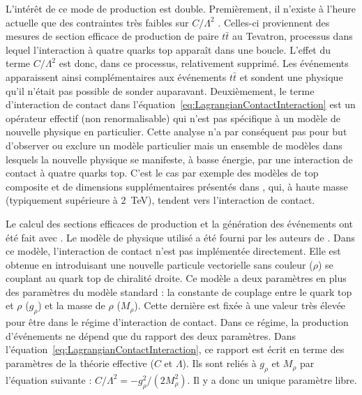 L'int\'er\^et de ce mode de production est double. 
Premi\`erement, il n'existe \`a l'heure actuelle que des contraintes tr\`es faibles sur $C/\Lambda^2$ \cite{1126-6708-2009-05-022}. 
Celles-ci proviennent des mesures de section efficace de production de paire $t\bar{t}$ au Tevatron, processus dans lequel l'interaction \`a quatre quarks top appara\^it dans une boucle. L'effet du terme $C/\Lambda^2$ est donc, dans ce processus, relativement supprim\'e. Les \'ev\'enements \fourtop{} apparaissent ainsi compl\'ementaires aux \'ev\'enements $t\bar{t}$ et sondent une physique qu'il n'\'etait pas possible de sonder auparavant. Deuxi\`emement, le terme d'interaction de contact dans l'\'equation~\ref{eq:LagrangianContactInteraction} est un op\'erateur effectif (non renormalisable) qui n'est pas sp\'ecifique \`a un mod\`ele de nouvelle physique en particulier. Cette analyse n'a par cons\'equent pas pour but d'observer ou exclure un mod\`ele particulier mais un ensemble de mod\`eles dans lesquels la nouvelle physique se manifeste, \`a basse \'energie, par une interaction de contact \`a quatre quarks top. C'est le cas par exemple des mod\`eles de top composite et de dimensions suppl\'ementaires pr\'esent\'es dans \cite{PhysRevD.78.074026, 1126-6708-2008-04-087, 1126-6708-2009-05-022, Guchait:2007jd}, qui, \`a haute masse (typiquement sup\'erieure \`a 2~TeV), tendent vers l'interaction de contact.

Le calcul des sections efficaces de production et la g\'en\'eration des \'ev\'enements ont \'et\'e fait avec . Le mod\`ele de physique utilis\'e a \'et\'e fourni par les auteurs de \cite{Degrande:2010kt}. Dans ce mod\`ele, l'interaction de contact n'est pas implément\'ee directement. Elle est obtenue en introduisant une nouvelle particule vectorielle sans couleur ($\rho$) se couplant au quark top de chiralit\'e droite. Ce mod\`ele a deux param\`etres en plus des param\`etres du mod\`ele standard : la constante de couplage entre le quark top et $\rho$ ($g_\rho$) et la masse de $\rho$ ($M_\rho$). Cette derni\`ere est fix\'ee \`a une valeur tr\`es \'elev\'ee pour \^etre dans le r\'egime d'interaction de contact. Dans ce r\'egime, la production d'\'ev\'enements \fourtop{} ne d\'epend que du rapport des deux param\`etres. Dans l'\'equation~\ref{eq:LagrangianContactInteraction}, ce rapport est \'ecrit en terme des param\`etres de la th\'eorie effective ($C$ et $\Lambda$). Ils sont reli\'es \`a $g_\rho$ et $M_\rho$ par l'\'equation suivante : $C/\Lambda^2 = -g_\rho^2/\left(2M_\rho^2\right)$. Il y a donc un unique param\`etre libre.

